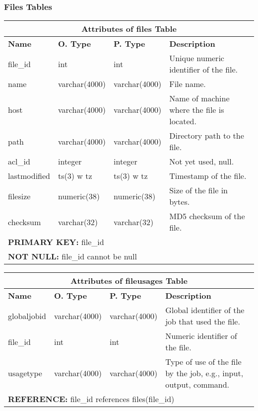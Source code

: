\subsubsection{Files Tables}
\begin{center}
  \begin{tabular}{|l|l|l|p{3.2in}|}\hline
    \multicolumn{4}{|c|}{\textbf{Attributes of files Table}}\\ \hline
    \textbf{Name} & \textbf{O. Type} & \textbf{P. Type} & \textbf{Description}\\ \hline
    file\_id & int & int & Unique numeric identifier of the file.\\ \hline
    name & varchar(4000) & varchar(4000) & File name.\\ \hline
    host & varchar(4000) & varchar(4000) & Name of machine where the file is located.\\ \hline
    path & varchar(4000) & varchar(4000) & Directory path to the file.\\ \hline
    acl\_id & integer & integer & Not yet used, null.\\ \hline
    lastmodified & ts(3) w tz & ts(3) w tz & Timestamp of the file.\\ \hline
    filesize & numeric(38) & numeric(38) & Size of the file in bytes.\\ \hline
    checksum & varchar(32) & varchar(32) & MD5 checksum of the file.\\ \hline
    \multicolumn{4}{|l|}{\textbf{PRIMARY KEY:} file\_id} \\ \hline
    \multicolumn{4}{|l|}{\textbf{NOT NULL:} file\_id cannot be null} \\ \hline
  \end{tabular}
\vspace{24pt}

  \begin{tabular}{|l|l|l|p{3.2in}|}\hline
    \multicolumn{4}{|c|}{\textbf{Attributes of fileusages Table}}\\ \hline
    \textbf{Name} & \textbf{O. Type} & \textbf{P. Type} & \textbf{Description}\\ \hline
    globaljobid & varchar(4000) & varchar(4000) & Global identifier of the job that used the file.\\ \hline
    file\_id & int & int & Numeric identifier of the file.\\ \hline
    usagetype & varchar(4000) & varchar(4000) & Type of use of the file by the job, e.g., input, output, command.\\ \hline
    \multicolumn{4}{|l|}{\textbf{REFERENCE:} file\_id references files(file\_id)} \\ \hline
  \end{tabular}
\vspace{24pt}


\end{center}
